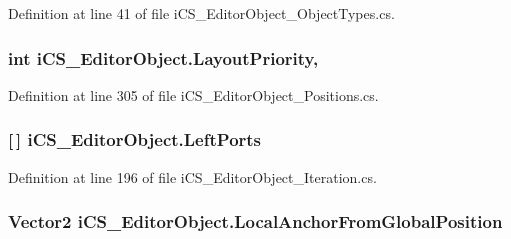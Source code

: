Definition at line 41 of file i\+C\+S\+\_\+\+Editor\+Object\+\_\+\+Object\+Types.\+cs.

\hypertarget{classi_c_s___editor_object_a05a3d9d21d01af82cbb7f12986823bd6}{
\subsubsection[{Layout\+Priority}]{\setlength{\rightskip}{0pt plus 5cm}int i\+C\+S\+\_\+\+Editor\+Object.\+Layout\+Priority\hspace{0.3cm}{\ttfamily [get]}, {\ttfamily [set]}}}\label{classi_c_s___editor_object_a05a3d9d21d01af82cbb7f12986823bd6}


Definition at line 305 of file i\+C\+S\+\_\+\+Editor\+Object\+\_\+\+Positions.\+cs.

\hypertarget{classi_c_s___editor_object_a039eb9dd00abe7a6f1da4b46bb405543}{
\subsubsection[{Left\+Ports}]{ \mbox{[}$\,$\mbox{]} i\+C\+S\+\_\+\+Editor\+Object.\+Left\+Ports\hspace{0.3cm}{\ttfamily [get]}}}\label{classi_c_s___editor_object_a039eb9dd00abe7a6f1da4b46bb405543}


Definition at line 196 of file i\+C\+S\+\_\+\+Editor\+Object\+\_\+\+Iteration.\+cs.

\hypertarget{classi_c_s___editor_object_a63ef964281f8fee0f6f875533826ee62}{
\subsubsection[{Local\+Anchor\+From\+Global\+Position}]{\setlength{\rightskip}{0pt plus 5cm}Vector2 i\+C\+S\+\_\+\+Editor\+Object.\+Local\+Anchor\+From\+Global\+Position\hspace{0.3cm}{\ttfamily [set]}}}\label{classi_c_s___editor_object_a63ef964281f8fee0f6f875533826ee62}


